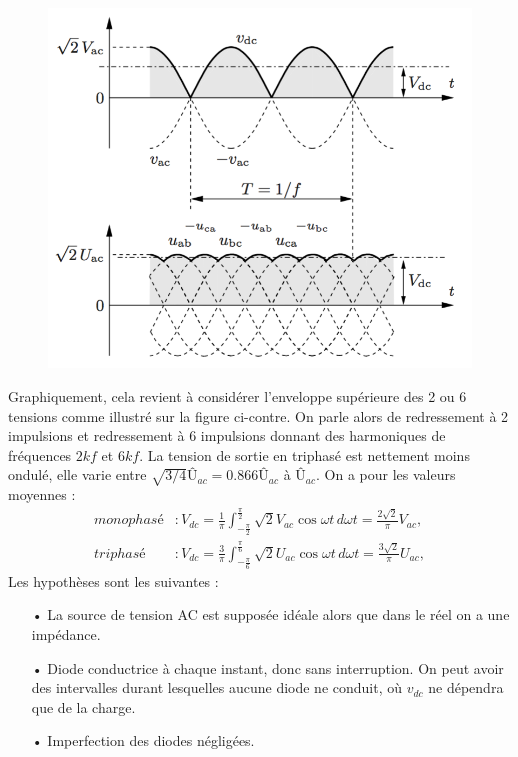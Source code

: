 	\begin{figure}
	\vspace{-5mm}
	\includegraphics[scale=0.3]{ch2/9}
	\end{figure} 			
	Graphiquement, cela revient à considérer l'enveloppe supérieure des 2 ou 6 tensions comme illustré sur la figure ci-contre. On parle alors de redressement à 2 impulsions et redressement à 6 impulsions donnant des harmoniques de fréquences $2kf$ et $6kf$. La tension de sortie en triphasé est nettement moins ondulé, elle varie entre $\sqrt{3/4}Û_{ac} = 0.866 Û_{ac}$ à $Û_{ac}$. On a pour les valeurs moyennes :
	\begin{equation}
		\begin{aligned}
		monophasé &: V_{dc} = \frac{1}{\pi}\int _{-\frac{\pi}{2}} ^ {\frac{\pi}{2}} \sqrt{2} V_{ac} \cos \omega t \, d\omega t = \frac{2\sqrt{2}}{\pi} V_{ac},\\
		triphasé &: V_{dc} = \frac{3}{\pi}\int _{-\frac{\pi}{6}} ^ {\frac{\pi}{6}} \sqrt{2} U_{ac} \cos \omega t \, d\omega t = \frac{3\sqrt{2}}{\pi} U_{ac},
		\end{aligned}
		\label{eq:2.14}
	\end{equation}
	Les hypothèses sont les suivantes : 
	\begin{itemize}
		\item[•] La source de tension AC est supposée idéale alors que dans le réel on a une impédance. 
		\item[•] Diode conductrice à chaque instant, donc sans interruption. On peut avoir des intervalles durant lesquelles aucune diode ne conduit, où $v_{dc}$ ne dépendra que de la charge. 
		\item[•] Imperfection des diodes négligées. 
	\end{itemize}
	
